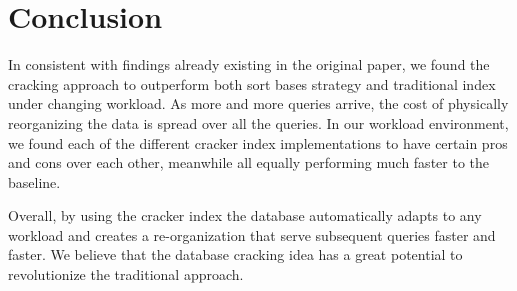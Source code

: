\section{Conclusion}
In consistent with findings already existing in the original paper, we found the cracking approach to outperform both sort bases strategy and traditional index under changing workload. As more and more queries arrive, the cost of physically reorganizing the data is spread over all the queries. In our workload environment, we found each of the different cracker index implementations to have certain pros and cons over each other, meanwhile all equally performing much faster to the baseline. 


Overall, by using the cracker index the database automatically adapts to any workload and creates a re-organization that serve subsequent queries faster and faster. We believe that the database cracking idea has a great potential to revolutionize the traditional approach.
\label{sec:conclusion}

